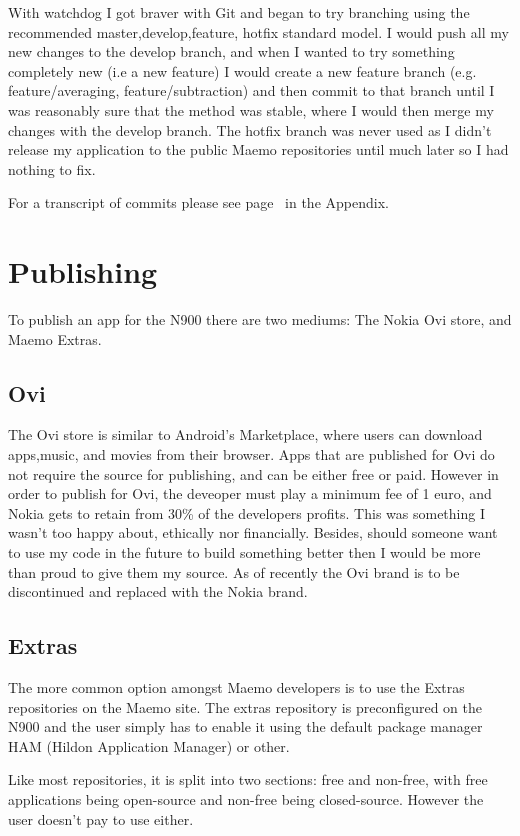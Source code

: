 With watchdog I got braver with Git and began to try branching using the recommended master,develop,feature, hotfix standard model. I would push all my new changes to the develop branch, and when I wanted to try something completely new (i.e a new feature) I would create a new feature branch (e.g. feature/averaging, feature/subtraction) and then commit to that branch until I was reasonably sure that the method was stable, where I would then merge my changes with the develop branch. The hotfix branch was never used as I didn’t release my application to the public Maemo repositories until much later so I had nothing to fix.

For a transcript of commits please see page~\pageref{commits} in the Appendix.


\section{Publishing}
To publish an app for the N900 there are two mediums: The Nokia Ovi store, and Maemo Extras.

\subsection{Ovi}
The Ovi store is similar to Android’s Marketplace, where users can download apps,music, and movies from their browser. Apps that are published for Ovi do not require the source for publishing, and can be either free or paid. However in order to publish for Ovi, the deveoper must play a minimum fee of 1 euro, and Nokia gets to retain from 30\% of the developers profits. This was something I wasn’t too happy about, ethically nor financially. Besides, should someone want to use my code in the future to build something better then I would be more than proud to give them my source. As of recently the Ovi brand is to be discontinued and replaced with the Nokia brand.

\subsection{Extras}
The more common option amongst Maemo developers is to use the Extras repositories on the Maemo site. The extras repository is preconfigured on the N900 and the user simply has to enable it using the default package manager HAM (Hildon Application Manager) or other.

Like most repositories, it is split into two sections: free and non-free, with free applications being open-source and non-free being closed-source. However the user doesn’t pay to use either.

